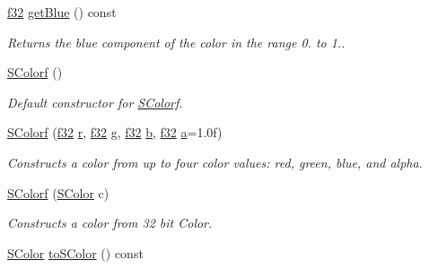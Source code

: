 \begin{DoxyCompactItemize}
\mbox{\label{classirr_1_1video_1_1SColorf_a769bee9289a9c08d6a8977f562112b95}} 
\hyperlink{namespaceirr_a0277be98d67dc26ff93b1a6a1d086b07}{f32} \hyperlink{classirr_1_1video_1_1SColorf_a769bee9289a9c08d6a8977f562112b95}{get\+Blue} () const
\begin{DoxyCompactList}\small\item\em Returns the blue component of the color in the range 0. to 1.. \end{DoxyCompactList}\item 
\hyperlink{classirr_1_1video_1_1SColorf_a701ea1b449c2aae4a3dd44a13055ac3e}{S\+Colorf} ()
\begin{DoxyCompactList}\small\item\em Default constructor for \hyperlink{classirr_1_1video_1_1SColorf}{S\+Colorf}. \end{DoxyCompactList}\item 
\hyperlink{classirr_1_1video_1_1SColorf_adaf8df839d5174aedba17e61ba28fc64}{S\+Colorf} (\hyperlink{namespaceirr_a0277be98d67dc26ff93b1a6a1d086b07}{f32} \hyperlink{classirr_1_1video_1_1SColorf_aaabdd1e2ef53f24e9dec70d5d531e425}{r}, \hyperlink{namespaceirr_a0277be98d67dc26ff93b1a6a1d086b07}{f32} \hyperlink{classirr_1_1video_1_1SColorf_abcb076ccba5f994d6dca52aed397d59a}{g}, \hyperlink{namespaceirr_a0277be98d67dc26ff93b1a6a1d086b07}{f32} \hyperlink{classirr_1_1video_1_1SColorf_a82d235f32be8c4a5a07acb45abde726e}{b}, \hyperlink{namespaceirr_a0277be98d67dc26ff93b1a6a1d086b07}{f32} \hyperlink{classirr_1_1video_1_1SColorf_add63387fd1fd80d09500b85ae679b050}{a}=1.\+0f)
\begin{DoxyCompactList}\small\item\em Constructs a color from up to four color values\+: red, green, blue, and alpha. \end{DoxyCompactList}\item 
\hyperlink{classirr_1_1video_1_1SColorf_a78bdda49d8605203acc99854cc9722b7}{S\+Colorf} (\hyperlink{classirr_1_1video_1_1SColor}{S\+Color} c)
\begin{DoxyCompactList}\small\item\em Constructs a color from 32 bit Color. \end{DoxyCompactList}\item 
\mbox{\label{classirr_1_1video_1_1SColorf_ac2f8bda88252139531ce041819aabee6}} 
\hyperlink{classirr_1_1video_1_1SColor}{S\+Color} \hyperlink{classirr_1_1video_1_1SColorf_ac2f8bda88252139531ce041819aabee6}{to\+S\+Color} () const

\end{DoxyCompactItemize}
